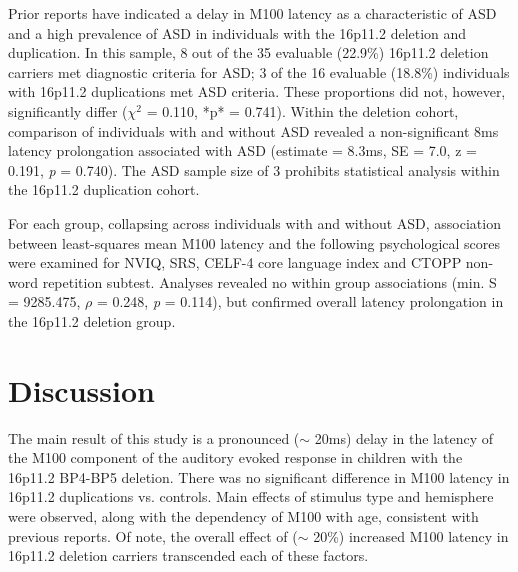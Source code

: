 \documentclass{article}
\begin{document}
\bigskip


Prior reports have indicated a delay in M100 latency as a characteristic of ASD and a high prevalence of ASD in individuals with the 16p11.2 deletion and duplication. In this sample, 8 out of the 35 evaluable (22.9\%) 16p11.2 deletion carriers met diagnostic criteria for ASD; 3 of the 16 evaluable (18.8\%) individuals with 16p11.2 duplications met ASD criteria. These proportions did not, however, significantly differ ($\chi^2$ = 0.110, *p* = 0.741). Within the deletion cohort, comparison of individuals with and without ASD revealed a non-significant 8ms latency prolongation associated with ASD (estimate = 8.3ms, SE = 7.0, z = 0.191, \emph{p} = 0.740). The ASD sample size of 3 prohibits statistical analysis within the 16p11.2 duplication cohort. 

\medskip

For each group, collapsing across individuals with and without ASD, association between least-squares mean M100 latency and the following psychological scores were examined for NVIQ, SRS, CELF-4 core language index and CTOPP non-word repetition subtest. Analyses revealed no within group associations (min. S = 9285.475, $\rho$ = 0.248, \emph{p} = 0.114), but confirmed overall latency prolongation in the 16p11.2 deletion group.  

\medskip


\section{Discussion}

The main result of this study is a pronounced ($\sim$ 20ms) delay in the latency of the M100 component of the auditory evoked response in children with the 16p11.2 BP4-BP5 deletion. There was no significant difference in M100 latency in 16p11.2 duplications vs. controls. Main effects of stimulus type and hemisphere were observed, along with the dependency of M100 with age, consistent with previous reports. Of note, the overall effect of ($\sim$ 20\%) increased M100 latency in 16p11.2 deletion carriers transcended each of these factors. 

\medskip
\end{document}
